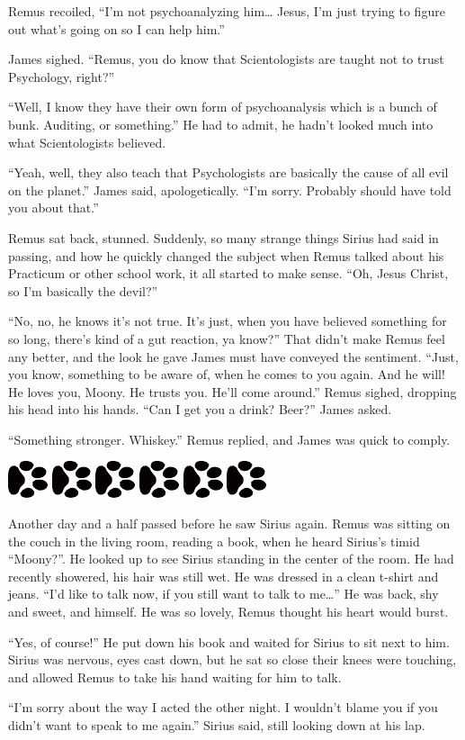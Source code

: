 \documentclass[12pt,twoside,openright]{memoir}
\newcommand{\myrulez}{	
	\begin{center}
		\hspace{.5em}
		\includegraphics[angle=60]{dogprint.pdf}
		\hspace{.5em}
		\includegraphics[angle=120]{dogprint.pdf}
		\hspace{.5em}
		\includegraphics[angle=60]{dogprint.pdf}
		\hspace{.5em}
		\includegraphics[angle=120]{dogprint.pdf}
		\hspace{.5em}
		\includegraphics[angle=60]{dogprint.pdf}
		\hspace{.5em}
		\includegraphics[angle=120]{dogprint.pdf}
		\hspace{.5em}
	\end{center}
}
\begin{document}
Remus recoiled, ``I'm not psychoanalyzing him… Jesus, I'm just trying to figure out what's going on so I can help him.''

James sighed. ``Remus, you do know that Scientologists are taught not to trust Psychology, right?''

``Well, I know they have their own form of psychoanalysis which is a bunch of bunk. Auditing, or something.'' He had to admit, he hadn't looked much into what Scientologists believed.

``Yeah, well, they also teach that Psychologists are basically the cause of all evil on the planet.'' James said, apologetically. ``I'm sorry. Probably should have told you about that.''

Remus sat back, stunned. Suddenly, so many strange things Sirius had said in passing, and how he quickly changed the subject when Remus talked about his Practicum or other school work, it all started to make sense. ``Oh, Jesus Christ, so I'm basically the devil?''

``No, no, he knows it's not true. It's just, when you have believed something for so long, there's kind of a gut reaction, ya know?'' That didn't make Remus feel any better, and the look he gave James must have conveyed the sentiment. ``Just, you know, something to be aware of, when he comes to you again. And he will! He loves you, Moony. He trusts you. He'll come around.'' Remus sighed, dropping his head into his hands. ``Can I get you a drink? Beer?'' James asked.

``Something stronger. Whiskey.'' Remus replied, and James was quick to comply.

\myrulez

Another day and a half passed before he saw Sirius again. Remus was sitting on the couch in the living room, reading a book, when he heard Sirius's timid ``Moony?''. He looked up to see Sirius standing in the center of the room. He had recently showered, his hair was still wet. He was dressed in a clean t-shirt and jeans. ``I'd like to talk now, if you still want to talk to me…'' He was back, shy and sweet, and himself. He was so lovely, Remus thought his heart would burst.

``Yes, of course!'' He put down his book and waited for Sirius to sit next to him. Sirius was nervous, eyes cast down, but he sat so close their knees were touching, and allowed Remus to take his hand waiting for him to talk.

``I'm sorry about the way I acted the other night. I wouldn't blame you if you didn't want to speak to me again.'' Sirius said, still looking down at his lap.
\end{document}
